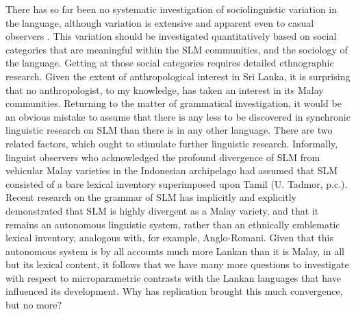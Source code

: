 There has so far been no systematic investigation of sociolinguistic variation in the language, although variation is extensive and apparent even to casual observers \citep[cf][]{Rassooltv}. This variation should be investigated quantitatively based on social categories that are meaningful within the SLM communities, and the sociology of the language. Getting at those social categories requires detailed ethnographic research. Given the extent of anthropological interest in Sri Lanka, it is surprising that no anthropologist, to my knowledge, has taken an interest in its Malay communities. Returning to the matter of grammatical investigation, it would be an obvious mistake to assume that there is any less to be discovered in synchronic linguistic research on SLM than there is in any other language. There are two related factors, which ought to stimulate further linguistic research. Informally, linguist observers who acknowledged the profound divergence of SLM from vehicular Malay varieties in the Indonesian archipelago had assumed that SLM consisted of a bare lexical inventory superimposed upon Tamil (U. Tadmor, p.c.). Recent research on the grammar of SLM has implicitly and explicitly demonstrated that SLM is highly divergent as a Malay variety, and that it remains an autonomous linguistic system, rather than an ethnically emblematic lexical inventory, analogous with, for example, Anglo-Romani. Given that this autonomous system is by all accounts much more Lankan than it is Malay, in all but its lexical content, it follows that we have many more questions to investigate with respect to microparametric contrasts with the Lankan languages that have influenced its development. Why has replication brought this much convergence, but no more?
